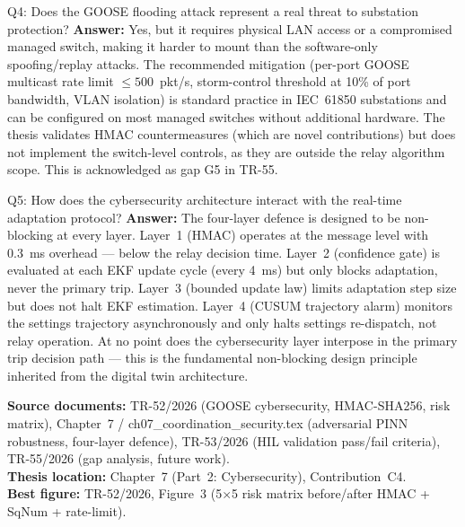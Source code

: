 \documentclass[12pt,a4paper]{article}
\begin{document}
\begin{keybox}{Q4: Does the GOOSE flooding attack represent a real threat to substation protection?}
\textbf{Answer:} Yes, but it requires physical LAN access or a compromised managed switch, making it harder to mount than the software-only spoofing/replay attacks. The recommended mitigation (per-port GOOSE multicast rate limit $\leq 500$~pkt/s, storm-control threshold at 10\% of port bandwidth, VLAN isolation) is standard practice in IEC~61850 substations and can be configured on most managed switches without additional hardware. The thesis validates HMAC countermeasures (which are novel contributions) but does not implement the switch-level controls, as they are outside the relay algorithm scope. This is acknowledged as gap G5 in TR-55.
\end{keybox}

\begin{keybox}{Q5: How does the cybersecurity architecture interact with the real-time adaptation protocol?}
\textbf{Answer:} The four-layer defence is designed to be non-blocking at every layer. Layer~1 (HMAC) operates at the message level with 0.3~ms overhead --- below the relay decision time. Layer~2 (confidence gate) is evaluated at each EKF update cycle (every 4~ms) but only blocks adaptation, never the primary trip. Layer~3 (bounded update law) limits adaptation step size but does not halt EKF estimation. Layer~4 (CUSUM trajectory alarm) monitors the settings trajectory asynchronously and only halts settings re-dispatch, not relay operation. At no point does the cybersecurity layer interpose in the primary trip decision path --- this is the fundamental non-blocking design principle inherited from the digital twin architecture.
\end{keybox}

\vfill
\begin{tcolorbox}[colback=iitmnavy!8,colframe=iitmnavy,arc=3pt,boxrule=0.8pt]
\small
\textbf{Source documents:} TR-52/2026 (GOOSE cybersecurity, HMAC-SHA256, risk matrix), Chapter~7 / ch07\_coordination\_security.tex (adversarial PINN robustness, four-layer defence), TR-53/2026 (HIL validation pass/fail criteria), TR-55/2026 (gap analysis, future work). \\
\textbf{Thesis location:} Chapter~7 (Part~2: Cybersecurity), Contribution~C4. \\
\textbf{Best figure:} TR-52/2026, Figure~3 (5$\times$5 risk matrix before/after HMAC + SqNum + rate-limit).
\end{tcolorbox}
\end{document}
